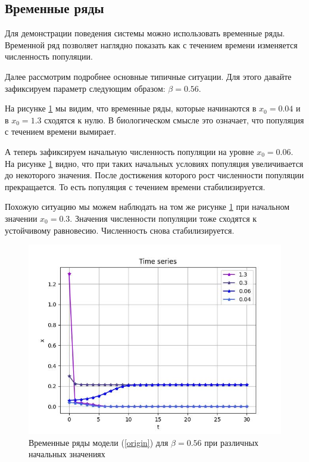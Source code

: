 \subsection{Временные ряды}

    Для демонстрации поведения системы можно использовать временные ряды. Временной ряд позволяет наглядно показать как с течением времени изменяется численность популяции.

    Далее рассмотрим подробнее основные типичные ситуации. Для этого давайте зафиксируем параметр следующим образом: \(\beta = 0.56\). 

    На рисунке \ref{time_series_b_0_56} мы видим, что временные ряды, которые начинаются в \(x_0 = 0.04\) и в \(x_0 = 1.3\) сходятся к нулю. В биологическом смысле это означает, что популяция с течением времени вымирает.

    А теперь зафиксируем начальную численность популяции на уровне \(x_0 = 0.06\). На рисунке \ref{time_series_b_0_56} видно, что при таких начальных условиях популяция увеличивается до некоторого значения. После достижения которого рост численности популяции прекращается. То есть популяция с течением времени стабилизируется.

    Похожую ситуацию мы можем наблюдать на том же рисунке \ref{time_series_b_0_56} при начальном значении \(x_0 = 0.3\). Значения численности популяции тоже сходятся к устойчивому равновесию. Численность снова стабилизируется.
    
    \begin{figure}
        \centering
        \includegraphics[width=\textwidth]{deterministic/images/time_series_b_0_56.jpg}

        \captionsetup{justification=centering}
        \caption{Временные ряды модели (\ref{origin}) для \(\beta = 0.56\) при различных начальных значениях}
        \label{time_series_b_0_56}
    \end{figure}

